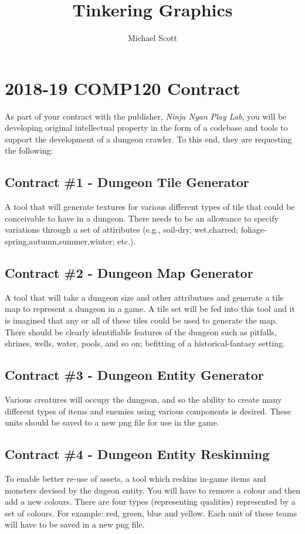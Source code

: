 \documentclass{../../fal_assignment}
\title{Tinkering Graphics}
\author{Michael Scott}
\begin{document}
\section*{2018-19 COMP120 Contract}

As part of your contract with the publisher, \textit{Ninja Nyan Play Lab}, you will be developing original intellectual property in the form of a codebase and tools to support the development of a dungeon crawler. To this end, they are requesting the following:

\subsection*{Contract \#1 - Dungeon Tile Generator}
A tool that will generate textures for various different types of tile that could be conceivable to have in a dungeon. There needs to be an allowance to specify variations through a set of attiributes (e.g., soil-dry, wet,charred; foliage-spring,autumn,summer,winter; etc.).

\subsection*{Contract \#2 - Dungeon Map Generator}
A tool that will take a dungeon size and other attributues and generate a tile map to represent a dungeon in a game. A tile set will be fed into this tool and it is imagined that any or all of these tiles could be used to generate the map. There should be clearly identifiable features of the dungeon such as pitfalls, shrines, wells, water, pools, and so on; befitting of a historical-fantasy setting.

\subsection*{Contract \#3 - Dungeon Entity Generator}
Various creatures will occupy the dungeon, and so the ability to create many different types of items and enemies using various components is desired. These units should be saved to a new png file for use in the game.

\subsection*{Contract \#4 - Dungeon Entity Reskinning}
To enable better re-use of assets, a tool which reskins in-game items and monsters devised by the dugeon entity. You will have to remove a colour and then add a new colours. There are four types (representing qualities) represented by a set of colours. For example: red, green, blue and yellow. Each unit of these teams will have to be saved in a new png file.
\end{document}

